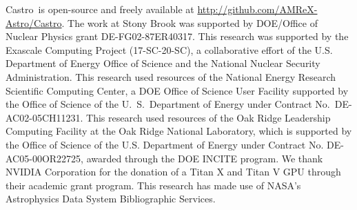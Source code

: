 \documentclass[preprint,times,tighten,linenumbers,trackchanges]{aastex631}
\newcommand{\castro}{{\sf Castro}}
\begin{document}



\begin{acknowledgements}
\castro\ is open-source and freely available at
\url{http://github.com/AMReX-Astro/Castro}.  The work at Stony Brook was supported by DOE/Office
of Nuclear Physics grant DE-FG02-87ER40317. This research was supported by the Exascale Computing 
Project (17-SC-20-SC), a collaborative effort of the U.S. Department of Energy
Office of Science and the National Nuclear Security Administration. This research used
resources of the National Energy Research Scientific Computing Center,
a DOE Office of Science User Facility supported by the Office of
Science of the U.~S.\ Department of Energy under Contract
No.\ DE-AC02-05CH11231.  This research used resources of the Oak Ridge
Leadership Computing Facility at the Oak Ridge National Laboratory,
which is supported by the Office of Science of the U.S. Department of
Energy under Contract No. DE-AC05-00OR22725, awarded through the DOE
INCITE program.  We thank NVIDIA Corporation for the donation of a
Titan X and Titan V GPU through their academic grant program.  This
research has made use of NASA's Astrophysics Data System Bibliographic
Services.
\end{acknowledgements}







\end{document}
